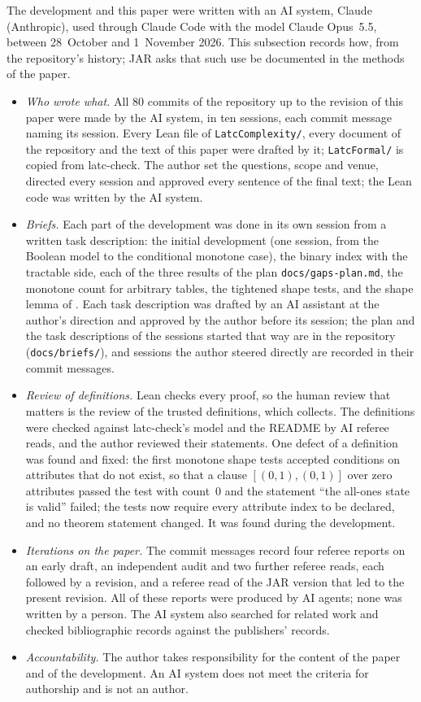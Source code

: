 \documentclass[pdflatex,sn-mathphys-num]{sn-jnl}
\theoremstyle{thmstyleone}
\theoremstyle{thmstylethree}
\begin{document}
The development and this paper were written with an AI system, Claude (Anthropic), used through
Claude Code with the model Claude Opus~5.5, between 28~October and 1~November 2026. This subsection records how, from the
repository's history; JAR asks that such use be documented in the methods of the paper.
\begin{itemize}
\item \emph{Who wrote what.} All 80 commits of the repository up to the revision of this paper
  were made by the AI system, in ten sessions, each commit message naming its session. Every
  Lean file of \texttt{LatcComplexity/}, every document of the repository and the text of this
  paper were drafted by it; \texttt{LatcFormal/} is copied from latc-check.
  The author set the questions, scope and venue, directed every session and approved every
  sentence of the final text; the Lean code was written by the AI system.
\item \emph{Briefs.} Each part of the development was done in its own session from a written task description: the initial development (one session, from the Boolean
  model to the conditional monotone case), the binary index with the tractable side, each of the
  three results of the plan \texttt{docs/gaps-plan.md}, the monotone count for arbitrary tables,
  the tightened shape tests, and the shape lemma of . Each task description was drafted by an AI assistant at the
  author's direction and approved by the author before its session; the plan and the task
  descriptions of the sessions started that way are in the repository (\texttt{docs/briefs/}),
  and sessions the author steered directly are recorded in their commit messages.
\item \emph{Review of definitions.} Lean checks every proof, so the human review that matters is
  the review of the trusted definitions, which  collects.
  The definitions were checked against latc-check's model and the README by AI referee reads,
  and the author reviewed their statements. One defect of a definition was found and fixed: the first monotone shape
  tests accepted conditions on attributes that do not exist, so that a clause $[(0,1),(0,1)]$
  over zero attributes passed the test with count~$0$ and the statement ``the all-ones state is
  valid'' failed; the tests now require every attribute index to be declared, and no theorem
  statement changed. It was found during the development.
\item \emph{Iterations on the paper.} The commit messages record four referee reports on an
  early draft, an independent audit and two further referee reads, each followed by a revision,
  and a referee read of the JAR version that led to the present revision. All of these reports
  were produced by AI agents; none was written by a person. The AI system also
  searched for related work and checked bibliographic records against the publishers' records.
\item \emph{Accountability.} The author takes responsibility for the content of the paper and of
  the development. An AI system does not meet the criteria for authorship and is not an author.
\end{itemize}
\end{document}
